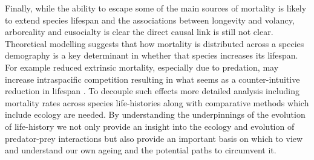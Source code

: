 Finally, while the ability to escape some of the main sources of mortality is likely to extend species lifespan and the associations between longevity and volancy, arboreality and eusocialty is clear the direct causal link is still not clear. Theoretical modelling suggests that how mortality is distributed across a species demography is a key determinant in whether that species increases its lifespan. For example reduced extrinsic mortality, especially due to predation, may increase intraspacific competition resulting in what seems as a counter-intuitive reduction in lifespan \citep{moorad2010evolution}. To decouple such effects more detailed analysis including mortality rates across species life-histories along with comparative methods which include ecology are needed. By understanding the underpinnings of the evolution of life-history we not only provide an insight into the ecology and evolution of predator-prey interactions but also provide an important basis on which to view and understand our own ageing and the potential paths to circumvent it.



%
%


